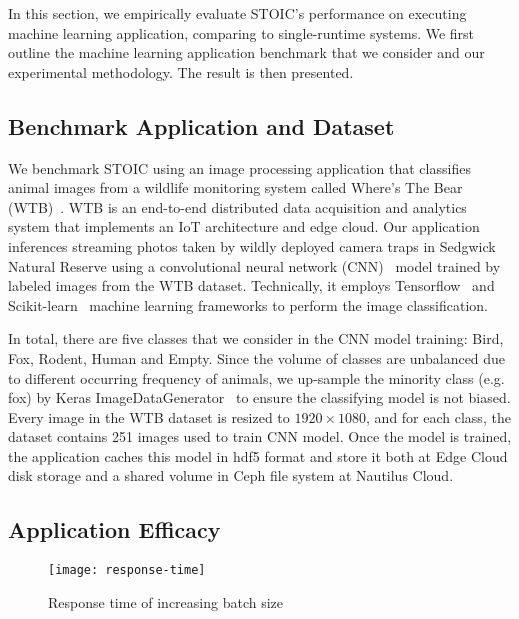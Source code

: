 In this section, we empirically evaluate STOIC's performance on executing machine learning application, comparing to single-runtime systems. We first outline the machine learning application benchmark that we consider and our experimental methodology. The result is then presented.

\subsection{Benchmark Application and Dataset}

We benchmark STOIC using an image processing application that classifies animal images from a wildlife monitoring system called Where's The Bear (WTB)~\cite{ref:wtb}. WTB is an end-to-end distributed data acquisition and analytics system that implements an IoT architecture and edge cloud. Our application inferences streaming photos taken by wildly deployed camera traps in Sedgwick Natural Reserve using a convolutional neural network (CNN)~\cite{ref:cnn} model trained by labeled images from the WTB dataset. Technically, it employs Tensorflow~\cite{ref:tensorflow} and Scikit-learn~\cite{ref:scikit} machine learning frameworks to perform the image classification.  

 In total, there are five classes that we consider in the CNN model training: Bird, Fox, Rodent, Human and Empty. Since the volume of classes are unbalanced due to different occurring frequency of animals, we up-sample the minority class (e.g. fox) by Keras ImageDataGenerator~\cite{ref:keras} to ensure the classifying model is not biased. Every image in the WTB dataset is resized to $1920 \times 1080$, and for each class, the dataset contains 251 images used to train CNN model. Once the model is trained, the application caches this model in hdf5 format and store it both at Edge Cloud disk storage and a shared volume in Ceph file system at Nautilus Cloud. 

\subsection{Application Efficacy}

\begin{figure}[t] \centering 
\texttt{[image: response-time]}
\caption{Response time of increasing batch size
\label{fig:response-time}}
\end{figure}

